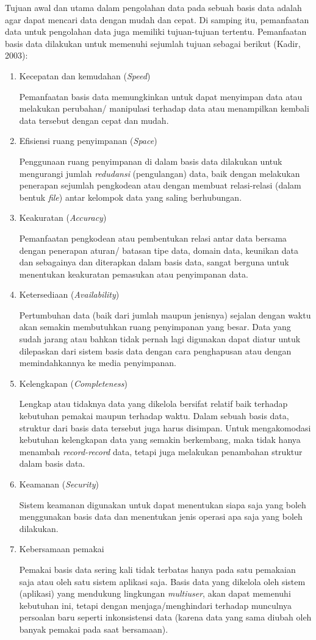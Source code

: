     Tujuan awal dan utama dalam pengolahan data pada sebuah basis data adalah agar dapat mencari data dengan mudah dan cepat. Di samping itu, pemanfaatan data untuk pengolahan data juga memiliki tujuan-tujuan tertentu. Pemanfaatan basis data dilakukan untuk memenuhi sejumlah tujuan sebagai berikut (Kadir, 2003):
    \begin{enumerate}
      \itemsep0em
      \item Kecepatan dan kemudahan (\emph{Speed})

      Pemanfaatan basis data memungkinkan untuk dapat menyimpan data atau melakukan perubahan/ manipulasi terhadap data atau menampilkan kembali data tersebut dengan cepat dan mudah.
      \item Efisiensi ruang penyimpanan (\emph{Space})

      Penggunaan ruang penyimpanan di dalam basis data dilakukan untuk mengurangi jumlah \emph{redudansi} (pengulangan) data, baik dengan melakukan penerapan sejumlah pengkodean atau dengan membuat relasi-relasi (dalam bentuk \emph{file}) antar kelompok data yang saling berhubungan.
      \item Keakuratan (\emph{Accuracy})

      Pemanfaatan pengkodean atau pembentukan relasi antar data bersama dengan penerapan aturan/ batasan tipe data, domain data, keunikan data dan sebagainya dan diterapkan dalam basis data, sangat berguna untuk menentukan keakuratan pemasukan atau penyimpanan data.
      \item Ketersediaan (\emph{Availability})

      Pertumbuhan data (baik dari jumlah maupun jenisnya) sejalan dengan waktu akan semakin membutuhkan ruang penyimpanan yang besar. Data yang sudah jarang atau bahkan tidak pernah lagi digunakan dapat diatur untuk dilepaskan dari sistem basis data dengan cara penghapusan atau dengan memindahkannya ke media penyimpanan.
      \item Kelengkapan (\emph{Completeness})

      Lengkap atau tidaknya data yang dikelola bersifat relatif baik terhadap kebutuhan pemakai maupun terhadap waktu. Dalam sebuah basis data, struktur dari basis data tersebut juga harus disimpan. Untuk mengakomodasi kebutuhan kelengkapan data yang semakin berkembang, maka tidak hanya menambah \emph{record-record} data, tetapi juga melakukan penambahan struktur dalam basis data.
      \item Keamanan (\emph{Security})

      Sistem keamanan digunakan untuk dapat menentukan siapa saja yang boleh menggunakan basis data dan menentukan jenis operasi apa saja yang boleh dilakukan.
      \item Kebersamaan pemakai

      Pemakai basis data sering kali tidak terbatas hanya pada satu pemakaian saja atau oleh satu sistem aplikasi saja. Basis data yang dikelola oleh sistem (aplikasi) yang mendukung lingkungan \emph{multiuser}, akan dapat memenuhi kebutuhan ini, tetapi dengan menjaga/menghindari terhadap munculnya persoalan baru seperti inkonsistensi data (karena data yang sama diubah oleh banyak pemakai pada saat bersamaan).
    \end{enumerate}

